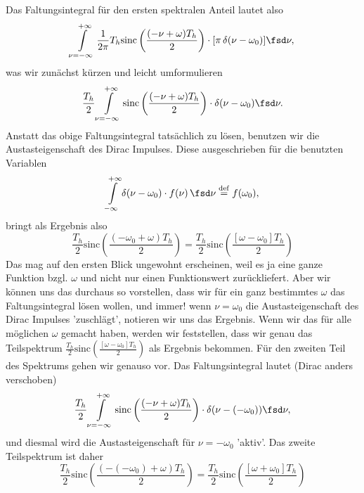 \begin{ExCalc}
Das Faltungsintegral für den ersten spektralen Anteil lautet also
\begin{equation}
\int\limits_{\nu=-\infty}^{+\infty}
\frac{1}{2\pi}
T_h \mathrm{sinc}\left(\frac{(-\nu+\omega) T_h}{2}\right)
\cdot
[\pi \, \delta(\nu-\omega_0)] \fsd \nu,
\end{equation}
was wir zunächst kürzen und leicht umformulieren
\begin{equation}
\frac{T_h}{2} \int\limits_{\nu=-\infty}^{+\infty}
\mathrm{sinc}\left(\frac{(-\nu+\omega) T_h}{2}\right)
\cdot
\delta(\nu-\omega_0) \fsd \nu.
\end{equation}
%
Anstatt das obige Faltungsintegral tatsächlich zu lösen, benutzen wir
die Austasteigenschaft des Dirac Impulses. Diese ausgeschrieben für die benutzten Variablen
\begin{equation}
\int\limits_{-\infty}^{+\infty} \delta(\nu-\omega_0) \cdot f(\nu) \, \fsd \nu \stackrel{\mathrm{def}}= f(\omega_0),
\end{equation}
bringt als Ergebnis also
\begin{equation}
\frac{T_h}{2}\mathrm{sinc}\left(\frac{(-\omega_0+\omega) T_h}{2}\right)=
\frac{T_h}{2}\mathrm{sinc}\left(\frac{[\omega-\omega_0] T_h}{2}\right)
\end{equation}
Das mag auf den ersten Blick ungewohnt erscheinen, weil es ja eine ganze Funktion
bzgl. $\omega$ und nicht nur einen Funktionswert zurückliefert.
Aber wir können uns das durchaus so vorstellen, dass wir für ein ganz bestimmtes
$\omega$ das Faltungsintegral lösen wollen, und immer!
wenn $\nu=\omega_0$ die Austasteigenschaft des Dirac Impulses 'zuschlägt',
notieren wir uns das Ergebnis.
Wenn wir das für alle möglichen $\omega$ gemacht haben, werden wir feststellen,
dass wir genau das Teilspektrum
$\frac{T_h}{2}\mathrm{sinc}\left(\frac{[\omega-\omega_0] T_h}{2}\right)$
als Ergebnis bekommen.
%
Für den zweiten Teil des Spektrums gehen wir genauso vor. Das Faltungsintegral
lautet (Dirac anders verschoben)
\begin{equation}
\frac{T_h}{2} \int\limits_{\nu=-\infty}^{+\infty}
\mathrm{sinc}\left(\frac{(-\nu+\omega) T_h}{2}\right)
\cdot
\delta(\nu-(-\omega_0)) \fsd \nu,
\end{equation}
und diesmal wird die Austasteigenschaft für $\nu=-\omega_0$ 'aktiv'.
Das zweite Teilspektrum ist daher
\begin{equation}
\frac{T_h}{2}\mathrm{sinc}\left(\frac{(-(-\omega_0)+\omega) T_h}{2}\right) =
\frac{T_h}{2}\mathrm{sinc}\left(\frac{[\omega+\omega_0] T_h}{2}\right)
\end{equation}

\end{ExCalc}
